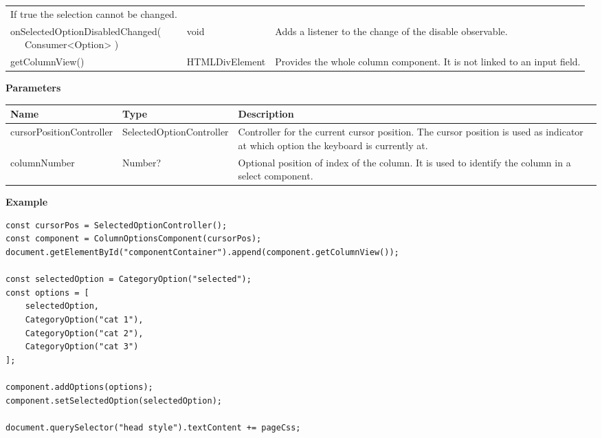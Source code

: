 \begin{table}[!htb]
\begin{tabular}{ p{5cm} p{3cm} p{4.5cm} }
                                                               If true the selection cannot be changed. \\
        \tbbr{
            onSelectedOptionDisabledChanged( \\
                \ \ \ Consumer<Option>
            )}                              & void           & Adds a listener to the change of the disable observable. \\
        getColumnView()                     & HTMLDivElement & Provides the whole column component. 
                                                               It is not linked to an input field. \\
        \bottomrule[1.2pt]
    \end{tabular}
\end{table}

\vspace*{6pt}
\noindent
\textbf{Parameters}

\begin{table}[!htb] 
    \label{api:columnOptionsComponentParameter}
    \footnotesize
    \setlength\extrarowheight{4pt}
    \begin{tabular}{ p{3.2cm} p{4.2cm} p{5.1cm} }
        \toprule[1.2pt]
        \textbf{Name}            & \textbf{Type}            & \textbf{Description} \\
        \midrule
        cursorPositionController & SelectedOptionController & Controller for the current cursor position. 
                                                              The cursor position is used as indicator at which option the keyboard is currently at. \\
        columnNumber             & Number?                  & Optional position of index of the column. 
                                                              It is used to identify the column in a select component. \\
        \bottomrule[1.2pt]
    \end{tabular}
\end{table}

\vspace*{6pt}
\noindent
\textbf{Example}

\begin{lstlisting}[style = htmlcssjs, label = api:columnOptionsComponentExample]
const cursorPos = SelectedOptionController();
const component = ColumnOptionsComponent(cursorPos);
document.getElementById("componentContainer").append(component.getColumnView());

const selectedOption = CategoryOption("selected");
const options = [ 
    selectedOption,
    CategoryOption("cat 1"),
    CategoryOption("cat 2"),
    CategoryOption("cat 3") 
];

component.addOptions(options);
component.setSelectedOption(selectedOption);

document.querySelector("head style").textContent += pageCss;
\end{lstlisting}

